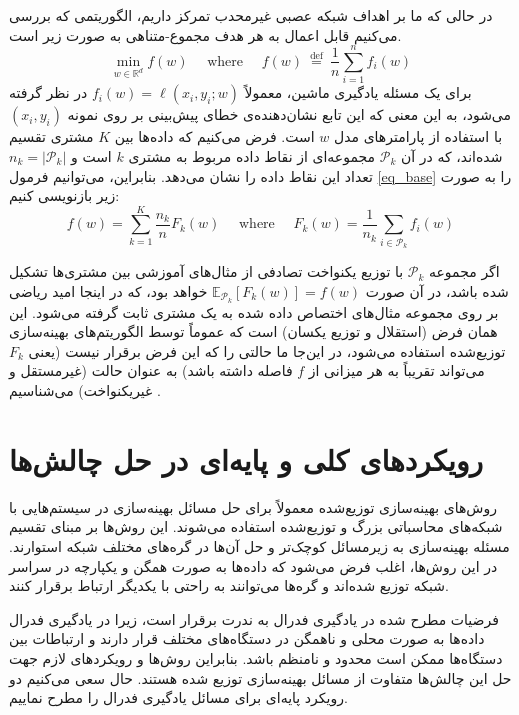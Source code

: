 در حالی که ما بر اهداف شبکه عصبی غیرمحدب
تمرکز داریم، الگوریتمی که بررسی می‌کنیم قابل اعمال به هر هدف مجموع-متناهی
به صورت زیر است.
\begin{equation}
\min _{w \in \mathbb{R}^d} f(w) \quad \text { where } \quad f(w) \stackrel{\text { def }}{=} \frac{1}{n} \sum_{i=1}^n f_i(w)
\label{eq_base}
\end{equation}
برای یک مسئله یادگیری ماشین، معمولاً
$f_i(w)=\ell\left(x_i, y_i ; w\right)$
در نظر گرفته می‌شود، به این معنی که این تابع نشان‌دهنده‌ی خطای پیش‌بینی بر روی نمونه
$(x_i, y_i)$
با استفاده از پارامترهای مدل
$w$
است. فرض می‌کنیم که داده‌ها بین
$K$
مشتری تقسیم شده‌اند، که در آن
$\mathcal{P}_k$
مجموعه‌ای از نقاط داده مربوط به مشتری
$k$
است و
$n_k=\left|\mathcal{P}_k\right|$
تعداد این نقاط داده را نشان می‌دهد. بنابراین، می‌توانیم فرمول
\ref{eq_base}
را به صورت زیر بازنویسی کنیم:
\begin{equation}
f(w)=\sum_{k=1}^K \frac{n_k}{n} F_k(w) \quad \text { where } \quad F_k(w)=\frac{1}{n_k} \sum_{i \in \mathcal{P}_k} f_i(w)
\end{equation}

اگر مجموعه
$\mathcal{P}_k$
با توزیع یکنواخت تصادفی از مثال‌های آموزشی بین مشتری‌ها تشکیل شده باشد، در آن صورت
$\mathbb{E}_{\mathcal{P}_k}\left[F_k(w)\right]=f(w)$ 
خواهد بود، که در اینجا امید ریاضی بر روی مجموعه مثال‌های اختصاص داده شده به یک مشتری ثابت گرفته می‌شود. این همان فرض
(استقلال و توزیع یکسان)
است که عموماً توسط الگوریتم‌های بهینه‌سازی توزیع‌شده استفاده می‌شود، در این‌جا ما حالتی را که این فرض برقرار نیست (یعنی
$F_k$
می‌تواند تقریباً به هر میزانی از
$f$
فاصله داشته باشد) به عنوان حالت
(غیرمستقل و غیریکنواخت)
می‌شناسیم
\cite{mcmahan2017communication}.


\section{رویکردهای کلی و پایه‌ای در حل چالش‌ها}
روش‌های بهینه‌سازی توزیع‌شده معمولاً برای حل مسائل بهینه‌سازی در سیستم‌هایی با شبکه‌های محاسباتی بزرگ و توزیع‌شده استفاده می‌شوند. این روش‌ها بر مبنای تقسیم مسئله بهینه‌سازی به زیرمسائل کوچک‌تر و حل آن‌ها در گره‌های مختلف شبکه استوارند. در این روش‌ها، اغلب فرض می‌شود که داده‌ها به صورت همگن و یکپارچه در سراسر شبکه توزیع شده‌اند و گره‌ها می‌توانند به راحتی با یکدیگر ارتباط برقرار کنند.

فرضیات مطرح شده در یادگیری فدرال به ندرت برقرار است، زیرا در یادگیری فدرال داده‌ها به صورت محلی و ناهمگن در دستگاه‌های مختلف قرار دارند و ارتباطات بین دستگاه‌ها ممکن است محدود و نامنظم باشد. بنابراین روش‌ها و رویکردهای لازم جهت حل این چالش‌ها متفاوت از مسائل بهینه‌سازی توزیع شده هستند. حال سعی می‌کنیم دو رویکرد پایه‌ای برای مسائل یادگیری فدرال را مطرح نماییم.

